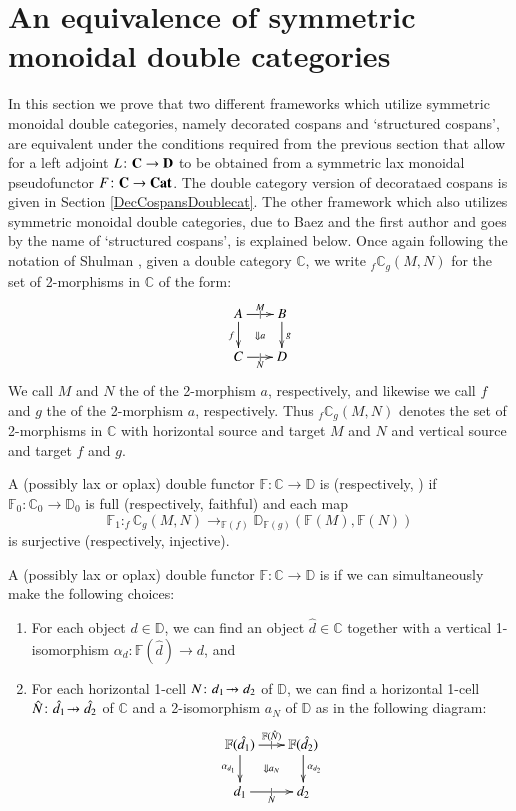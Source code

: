 \documentclass{amsart}
\begin{document}
\section{An equivalence of symmetric monoidal double categories}
In this section we prove that two different frameworks which utilize symmetric monoidal double categories, namely decorated cospans and `structured cospans', are equivalent under the conditions required from the previous section that allow for a left adjoint $L \colon \bold{C} \to \bold{D}$ to be obtained from a symmetric lax monoidal pseudofunctor $F \colon \bold{C} \to \bold{Cat}$. The double category version of decorataed cospans is given in Section \ref{DecCospansDoublecat}. The other framework which also utilizes symmetric monoidal double categories, due to Baez and the first author and goes by the name of `structured cospans', is explained below. Once again following the notation of Shulman \cite{Shul2}, given a double category $\mathbb{C}$, we write $_f \mathbb{C}_g(M,N)$ for the set of 2-morphisms in $\mathbb{C}$ of the form:
\[
  \xymatrix@-.5pc{
    A \ar[r]|{|}^{M}  \ar[d]_f \ar@{}[dr]|{\Downarrow a}&
    B\ar[d]^g\\
    C \ar[r]|{|}_N & D
  }
\]
We call $M$ and $N$ the  of the 2-morphism $a$, respectively, and likewise we call $f$ and $g$ the  of the 2-morphism $a$, respectively. Thus $_f \mathbb{C}_g(M,N)$ denotes the set of 2-morphisms in $\mathbb{C}$ with horizontal source and target $M$ and $N$ and vertical source and target $f$ and $g$.
\begin{defn}
A (possibly lax or oplax) double functor $\mathbb{F} \colon \mathbb{C} \to \mathbb{D}$ is  (respectively, ) if $\mathbb{F}_0 \colon \mathbb{C}_0 \to \mathbb{D}_0$ is full (respectively, faithful) and each map $$\mathbb{F}_1 \colon _f \mathbb{C}_g(M,N) \to _{\mathbb{F}(f)} \mathbb{D}_{\mathbb{F}(g)}(\mathbb{F}(M),\mathbb{F}(N))$$ is surjective (respectively, injective).
\end{defn}
\begin{defn}
A (possibly lax or oplax) double functor $\mathbb{F} \colon \mathbb{C} \to \mathbb{D}$ is  if we can simultaneously make the following choices:
\begin{enumerate}
\item{For each object $d \in \mathbb{D}$, we can find an object $\hat{d} \in \mathbb{C}$ together with a vertical 1-isomorphism $\alpha_d \colon \mathbb{F}(\hat{d}) \to d$, and}
\item{For each horizontal 1-cell $N \colon d_1 \tobar d_2$  of $\mathbb{D}$, we can find a horizontal 1-cell $\hat{N} \colon \hat{d_1} \tobar \hat{d_2}$ of $\mathbb{C}$ and a 2-isomorphism $a_{N}$ of $\mathbb{D}$ as in the following diagram:
\[
  \xymatrix@-.5pc{
    \mathbb{F}(\hat{d_1}) \ar[r]|{|}^{\mathbb{F}(\hat{N})}  \ar[d]_{\alpha_{d_1}} \ar@{}[dr]|{\Downarrow a_N}&
    \mathbb{F}(\hat{d_2}) \ar[d]^{\alpha_{d_2}}\\
    d_1 \ar[r]|{|}_N & d_2
  }
\]
}
\end{enumerate}
\end{defn}
\end{document}
